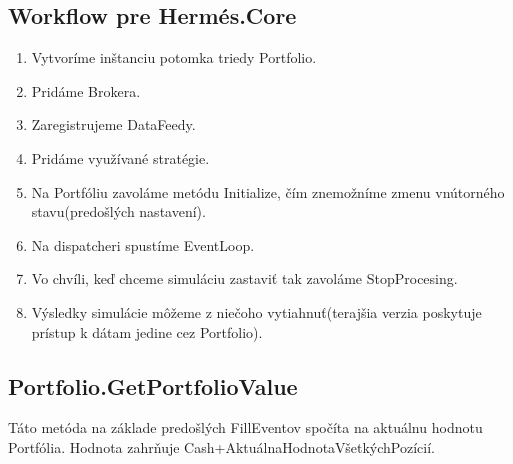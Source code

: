 \documentclass[a4paper]{article}
\begin{document}
\subsection{Workflow pre Hermés.Core}
\begin{enumerate}
\item Vytvoríme inštanciu potomka triedy Portfolio.
\item Pridáme Brokera.
\item Zaregistrujeme DataFeedy.
\item Pridáme využívané stratégie.
\item Na Portfóliu zavoláme metódu Initialize, čím znemožníme zmenu vnútorného stavu(predošlých nastavení).
\item Na dispatcheri spustíme EventLoop.
\item Vo chvíli, keď chceme simuláciu zastaviť tak zavoláme StopProcesing.
\item Výsledky simulácie môžeme z niečoho vytiahnuť(terajšia verzia poskytuje prístup k dátam jedine cez Portfolio).
\end{enumerate}


\subsection{Portfolio.GetPortfolioValue}
Táto metóda na základe predošlých FillEventov spočíta na aktuálnu hodnotu Portfólia. Hodnota zahrňuje Cash+AktuálnaHodnotaVšetkýchPozícií.
\end{document}
